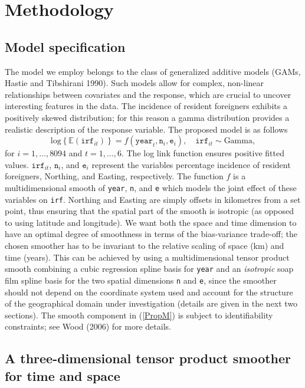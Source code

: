 \documentclass[10pt] {article}
\newcommand{\beq}{\begin{equation}}
\newcommand{\eeq}{\end{equation}}
\newcommand{\E}{\mathbb{E}}
\theoremstyle{definition}
\theoremstyle{plain}
\begin{document}
\section{Methodology \label{METH}}

\subsection{Model specification \label{MS}}

The model we employ belongs to the class of generalized additive models (GAMs, Hastie and Tibshirani 1990). Such models allow for complex, non-linear relationships between covariates and the response, which are crucial to uncover interesting features in the data. The incidence of resident foreigners exhibits a positively skewed distribution; for this reason a gamma distribution provides a realistic description of the response variable. The proposed model is as follows
\beq
\text{log}\left\{\E(\texttt{irf}_{it})\right\} = f(\texttt{year}_t,\texttt{n}_i,\texttt{e}_i), \quad \texttt{irf}_{it} \sim \text{Gamma},          
\label{PropM}
\eeq
for $i=1,\ldots,8094$ and $t=1,\ldots,6$. The log link function ensures positive fitted values. $\texttt{irf}_{it}$, $\texttt{n}_i$, and $\texttt{e}_i$ represent the variables percentage incidence of resident foreigners, Northing, and Easting, respectively. The function $f$ is a multidimensional smooth of \texttt{year}, \texttt{n}, and \texttt{e} which models the joint effect of these variables on \texttt{irf}. Northing and Easting are simply offsets in kilometres from a set point, thus ensuring that the spatial part of the smooth is isotropic (as opposed to using latitude and longitude). We want both the space and time dimension to have an optimal degree of smoothness in terms of the bias-variance trade-off; the chosen smoother has to be invariant to the relative scaling of space (km) and time (years). This can be achieved by using a multidimensional tensor product smooth combining a cubic regression spline basis for \texttt{year} and an \textit{isotropic} soap film spline basis for the two spatial dimensions \texttt{n} and \texttt{e}, since the smoother should not depend on the coordinate system used and account for the structure of the geographical domain under investigation (details are given in the next two sections). The smooth component in (\ref{PropM}) is subject to identifiability constraints; see Wood (2006) for more details.

\subsection{A three-dimensional tensor product smoother for time and space \label{3D}}
\end{document}

